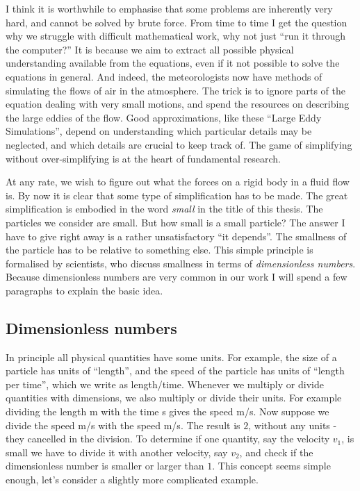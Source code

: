 \documentclass[thesis.tex]{subfiles}
\begin{document}
I think it is worthwhile to emphasise that some problems are inherently very hard, and cannot be solved by brute force. From time to time I get the question why we struggle with difficult mathematical work, why not just ``run it through the computer?'' It is because we aim to extract all possible physical understanding available from the equations, even if it not possible to solve the equations in general. And indeed, the meteorologists now have methods of simulating the flows of air in the atmosphere. The trick is to ignore parts of the equation dealing with very small motions, and spend the resources on describing the large eddies of the flow. Good approximations, like these ``Large Eddy Simulations'', depend on understanding which particular details may be neglected, and which details are crucial to keep track of. The game of simplifying without over-simplifying is at the heart of fundamental research.

At any rate, we wish to figure out what the forces on a rigid body in a fluid flow is. By now it is clear that some type of simplification has to be made. The great simplification is embodied in the word \emph{small} in the title of this thesis. The particles we consider are small. But how small is a small particle? The answer I have to give right away is a rather unsatisfactory ``it depends''. The smallness of the particle has to be relative to something else. This simple principle is formalised by scientists, who discuss smallness in terms of \emph{dimensionless numbers}. Because dimensionless numbers are very common in our work I will spend a few paragraphs to explain the basic idea.

\subsection{Dimensionless numbers}

In principle all physical quantities have some units. For example, the size of a particle has units of ``length'', and the speed of the particle has units of ``length per time'', which we write as length/time. Whenever we multiply or divide quantities with dimensions, we also multiply or divide their units. For example dividing the length \unit[20]{m} with the time \unit[5]{s} gives the speed \unit[4]{m/s}. Now suppose we divide the speed \unit[4]{m/s} with the speed \unit[2]{m/s}. The result is $2$, without any units - they cancelled in the division. To determine if one quantity, say the velocity $v_1$, is small we have to divide it with another velocity, say $v_2$, and check if the dimensionless number is smaller or larger than $1$. This concept seems simple enough, let's consider a slightly more complicated example.
\end{document}
